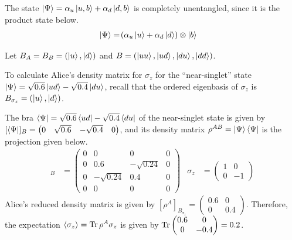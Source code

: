 \begin{answer}
	The state $\ket{\Psi} = \alpha_u \ket{u, b} + \alpha_d \ket{d, b}$ is completely unentangled, since it is the product state below.
	\begin{align}
		\ket{\Psi} & = \!\left(\alpha_u \ket{u} + \alpha_d \ket{d}\right) \otimes \ket{b}
	\end{align}
\end{answer}

Let $B_{A} = B_B = \left(\ket{u}, \ket{d}\right)$ and $B = \left(\ket{u u}, \ket{u d}, \ket{d u}, \ket{d d}\right)$.

\begin{answer}
	To calculate Alice's density matrix for $\sigma_z$ for the ``near-singlet'' state $\ket{\Psi} = \sqrt{0.6} \ket{u d} - \sqrt{0.4} \ket{d u}$, recall that the ordered eigenbasis of $\sigma_z$ is $B_{\sigma_z} = \left(\ket{u}, \ket{d}\right)$.

	The bra $\bra{\Psi} = \sqrt{0.6} \bra{u d} - \sqrt{0.4} \bra{d u}$ of the near-singlet state is given by $[\bra{\Psi}]_B = \begin{pmatrix} 0 & \sqrt{0.6} & -\sqrt{0.4} & 0 \end{pmatrix}$, and its density matrix $\rho^{AB} = \ket{\Psi} \bra{\Psi}$ is the projection given below.
	\begin{align}
		[\rho^{AB}]_B & =
		\begin{pmatrix}
			0 & 0            & 0            & 0 \\
			0 & 0.6          & -\sqrt{0.24} & 0 \\
			0 & -\sqrt{0.24} & 0.4          & 0 \\
			0 & 0            & 0            & 0
		\end{pmatrix}
		              &
		\sigma_z      & =
		\begin{pmatrix}
			1 & 0  \\
			0 & -1
		\end{pmatrix}
	\end{align}
	Alice's reduced density matrix is given by $[\rho^{A}]_{B_{\sigma_z}} =
		\begin{pmatrix}
			0.6 & 0   \\
			0   & 0.4
		\end{pmatrix}$.
	Therefore, the expectation $\braket{\sigma_z} = \operatorname{Tr} \rho^A \sigma_z$ is given by $\operatorname{Tr} \begin{pmatrix} 0.6 & 0 \\ 0 & -0.4 \end{pmatrix} = 0.2$.
\end{answer}

